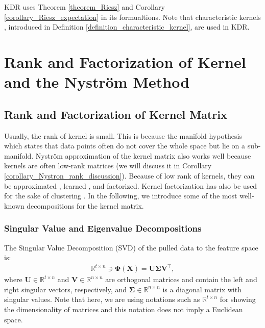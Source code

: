 \documentclass[lang=cn,10pt]{gorgeousnbook}
\numberwithin{equation}{section}%
\numberwithin{figure}{section}%
\begin{document}
KDR uses Theorem \ref{theorem_Riesz} and Corollary \ref{corollary_Riesz_expectation} in its formualtions. 
Note that characteristic kernels \cite{fukumizu2008characteristic}, introduced in Definition \ref{definition_characteristic_kernel}, are used in KDR. 


\section{Rank and Factorization of Kernel and the Nystr{\"o}m Method}\label{section_factorization_and_Nystrom_method}

\subsection{Rank and Factorization of Kernel Matrix}

Usually, the rank of kernel is small. This is because the manifold hypothesis which states that data points often do not cover the whole space but lie on a sub-manifold. Nystr{\"o}m approximation of the kernel matrix also works well because kernels are often low-rank matrices (we will discuss it in Corollary \ref{corollary_Nystron_rank_discussion}). 
Because of low rank of kernels, they can be approximated \cite{kishore2017literature}, learned \cite{kulis2006learning,kulis2009low}, and factorized. 
Kernel factorization has also be used for the sake of clustering \cite{wang2010low}.
In the following, we introduce some of the most well-known decompositions for the kernel matrix. 

\subsubsection{Singular Value and Eigenvalue Decompositions}

The Singular Value Decomposition (SVD) of the pulled data to the feature space is:
\begin{align}\label{equation_SVD_Phi}
\mathbb{R}^{t \times n} \ni \boldsymbol{\Phi}(\boldsymbol{X}) = \boldsymbol{U}\boldsymbol{\Sigma}\boldsymbol{V}^\top,
\end{align}
where $\boldsymbol{U} \in \mathbb{R}^{t \times n}$ and $\boldsymbol{V} \in \mathbb{R}^{n \times n}$ are orthogonal matrices and contain the left and right singular vectors, respectively, and $\boldsymbol{\Sigma} \in \mathbb{R}^{n \times n}$ is a diagonal matrix with singular values.  
Note that here, we are using notations such as $\mathbb{R}^{t \times n}$ for showing the dimensionality of matrices and this notation does not imply a Euclidean space. 
\end{document}
